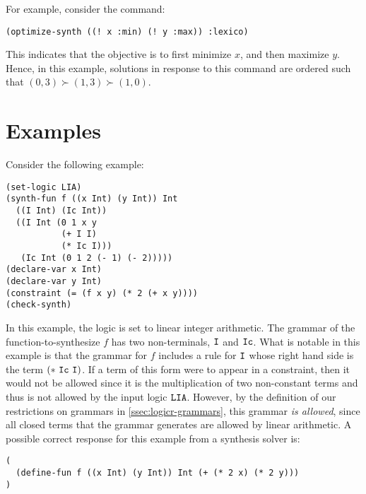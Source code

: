 \documentclass[english,a4paper,10pt]{article}
\begin{document}
\noindent
For example, consider the command:
\begin{lstlisting}[language=SyGuS, numbers=none, basicstyle=\ttfamily\small]
(optimize-synth ((! x :min) (! y :max)) :lexico)
\end{lstlisting}
This indicates that the objective is to first minimize $x$, and then maximize $y$.
Hence, in this example, solutions in response to this command are ordered such that
$(0,3) \succ (1,3) \succ (1,0)$.

\section{Examples}%
\label{sec:examples}


\begin{example}
Consider the following example:
\begin{lstlisting}[language=SyGuS]
(set-logic LIA)
(synth-fun f ((x Int) (y Int)) Int
  ((I Int) (Ic Int))
  ((I Int (0 1 x y
           (+ I I)
           (* Ic I)))
   (Ic Int (0 1 2 (- 1) (- 2)))))
(declare-var x Int)
(declare-var y Int)
(constraint (= (f x y) (* 2 (+ x y))))
(check-synth)
\end{lstlisting}
In this example, the logic is set 
to linear integer arithmetic.
The grammar of the function-to-synthesize $f$
has two non-terminals, ${\tt I}$ and ${\tt Ic}$.
What is notable in this example is that
the grammar for $f$ includes a rule for ${\tt I}$ whose right hand side 
is the term ${\tt(*\ Ic\ I)}$. 
If a term of this form were to appear
in a constraint, 
then it would not be allowed since it is the
multiplication of two non-constant terms and thus is not allowed by the input logic ${\tt LIA}$.
However, 
by the definition of our restrictions on grammars in \cref{ssec:logicr-grammars},
this grammar \emph{is allowed},
since all closed terms that the grammar generates are allowed by linear arithmetic.
A possible correct response for this example from a synthesis solver is:
\begin{lstlisting}[language=SyGuS]
(
  (define-fun f ((x Int) (y Int)) Int (+ (* 2 x) (* 2 y)))
)
\end{lstlisting}
\end{example}
\end{document}
